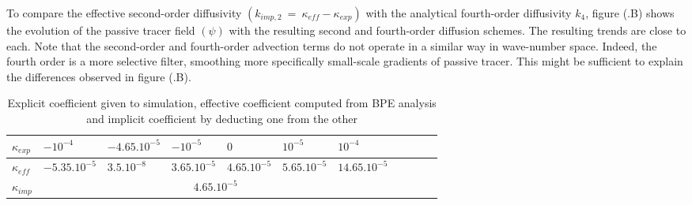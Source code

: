 To compare the effective second-order diffusivity $(k_{imp,2}\ =\ \kappa_{eff}-\kappa_{exp})$ with the analytical fourth-order diffusivity $k_4$, figure (.B) shows the evolution of the passive tracer field $(\psi)$ with the resulting second and fourth-order diffusion schemes. The resulting trends are close to each.
Note that the second-order and fourth-order advection terms do not operate in a similar way in wave-number space. Indeed, the fourth order is a more selective filter, smoothing more specifically small-scale gradients of passive tracer. This might be sufficient to explain the differences observed in figure (.B).
\begin{table}[h!]
\centering
\begin{tabular}{|l|l|l|l|l|l|l|l|l|l|l|}
\hline
$\kappa_{exp}$ & $-10^{-4}$ &$-4.65.10^{-5}$ & $-10^{-5}$& $0$& $10^{-5}$& $10^{-4}$\\
\hline
$\kappa_{eff}$ & $-5.35.10^{-5}$ &$3.5.10^{-8}$ & $3.65.10^{-5}$& $4.65.10^{-5}$& $5.65.10^{-5}$& $14.65.10^{-5}$\\
\hline
$\kappa_{imp}$&\multicolumn{6}{c|}{$4.65.10^{-5}$}\\
\hline
\end{tabular}
\caption{Explicit coefficient given to simulation, effective coefficient computed from BPE analysis and implicit coefficient by deducting one from the other}
\label{table_kappa}
\end{table}

